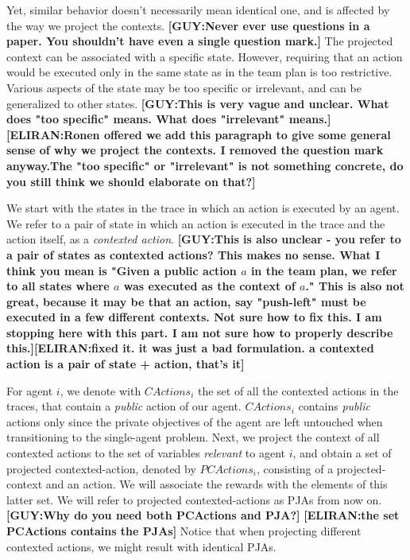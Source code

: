 \documentclass[letterpaper]{article} %
\newcommand{\eliran}[1]{\textbf{[\color{red}ELIRAN:#1]}}
\newcommand{\guy}[1]{\textbf{[\color{orange}GUY:#1]}}
\begin{document}
Yet, similar behavior doesn't necessarily mean identical one, and is affected by the way we project the contexts. \guy{Never ever use questions in a paper. You shouldn't have even a single question mark.}
The projected context can be associated with a specific state. However, requiring that an action would be executed only in the same state as in the team plan is too restrictive. Various aspects of the state may be too specific or irrelevant, and can be generalized to other states. \guy{This is very vague and unclear. What does "too specific" means. What does "irrelevant" means.}\eliran{Ronen offered we add this paragraph to give some general sense of why we project the contexts. I removed the question mark anyway.The "too specific" or "irrelevant" is not something concrete, do you still think we should elaborate on that?}



We start with the states in the trace in which an action is executed by an agent. We refer to a pair of state in which
an action is executed in the trace and the action itself,
as a \emph{contexted action}. \guy{This is also unclear - you refer to a pair of states as contexted actions? This makes no sense. What I think you mean is "Given a public action $a$ in the team plan, we refer to all states where $a$ was executed as the context of $a$." This is also not great, because it may be that an action, say "push-left" must be executed in a few different contexts. Not sure how to fix this. I am stopping here with this part. I am not sure how to properly describe this.}\eliran{fixed it. it was just a bad formulation. a contexted action is a pair of state + action, that's it}

For agent $i$, we denote with $CActions_i$ the set of all the contexted actions in the traces, that contain a \emph{public} action of our agent.
$CActions_i$ contains \emph{public} actions only since the private objectives of the agent are left untouched when transitioning to the single-agent problem.
Next, we project the context of all contexted actions to
the set of variables \emph{relevant} to agent $i$,
and obtain a set of projected contexted-action, denoted by $PCActions_i$, consisting of
a projected-context and an action. We will associate
the rewards with the elements of this latter set. We will refer to projected contexted-actions as PJAs from now on. \guy{Why do you need both PCActions and PJA?} \eliran{the set PCActions contains the PJAs} Notice that when projecting different contexted actions, we might result with identical PJAs.
\end{document}
